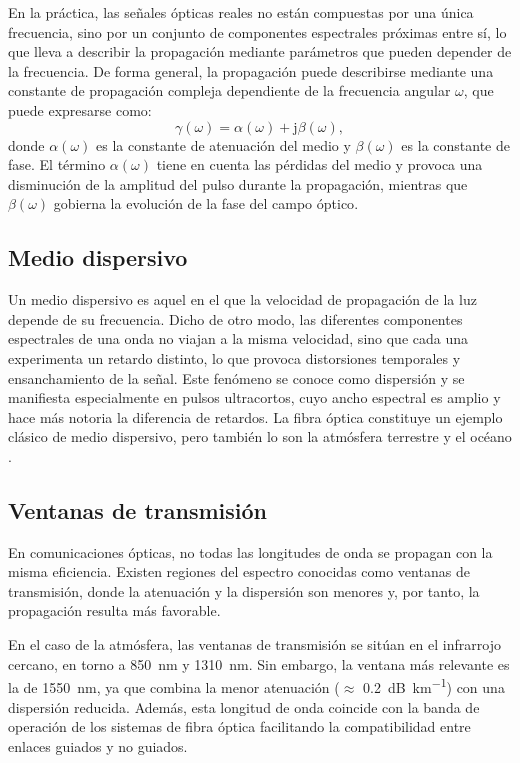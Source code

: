 En la práctica, las señales ópticas reales no están compuestas por una única frecuencia, sino por un conjunto de componentes espectrales próximas entre sí, lo que lleva a describir la propagación mediante parámetros que pueden depender de la frecuencia. De forma general, la propagación puede describirse mediante una constante de propagación compleja dependiente de la frecuencia angular $\omega$, que puede expresarse como:
\begin{equation}
\gamma(\omega) = \alpha(\omega) + \mathrm{j}\beta(\omega),
\end{equation}
donde $\alpha(\omega)$ es la constante de atenuación del medio y $\beta(\omega)$ es la constante de fase. El término $\alpha(\omega)$ tiene en cuenta las pérdidas del medio y provoca una disminución de la amplitud del pulso durante la propagación, mientras que $\beta(\omega)$ gobierna la evolución de la fase del campo óptico\cite{ScienceDirect}.

\subsection{Medio dispersivo}
Un medio dispersivo es aquel en el que la velocidad de propagación de la luz depende de su frecuencia. Dicho de otro modo, las diferentes componentes espectrales de una onda no viajan a la misma velocidad, sino que cada una experimenta un retardo distinto, lo que provoca distorsiones temporales y ensanchamiento de la señal. Este fenómeno se conoce como dispersión y se manifiesta especialmente en pulsos ultracortos, cuyo ancho espectral es amplio y hace más notoria la diferencia de retardos. La fibra óptica constituye un ejemplo clásico de medio dispersivo, pero también lo son la atmósfera terrestre y el océano \cite{España}.

\subsection{Ventanas de transmisión}
En comunicaciones ópticas, no todas las longitudes de onda se propagan con la misma eficiencia. Existen regiones del espectro conocidas como ventanas de transmisión, donde la atenuación y la dispersión son menores y, por tanto, la propagación resulta más favorable.

En el caso de la atmósfera, las ventanas de transmisión se sitúan en el infrarrojo cercano, en torno a \SI{850}{\nano\meter} y \SI{1310}{\nano\meter}. Sin embargo, la ventana más relevante es la de \SI{1550}{\nano\meter}, ya que combina la menor atenuación (\textnormal{$\approx$} \SI{0.2}{\deci\bel\per\kilo\meter}) con una dispersión reducida\cite{España}. Además, esta longitud de onda coincide con la banda de operación de los sistemas de fibra óptica facilitando la compatibilidad entre enlaces guiados y no guiados.

